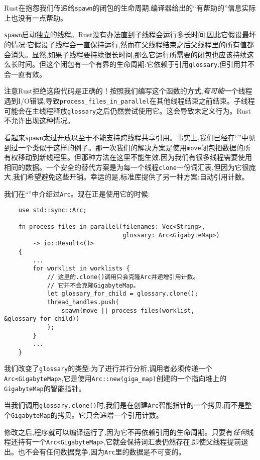 Rust在抱怨我们传递给\texttt{spawn}的闭包的生命周期,编译器给出的“有帮助的”信息实际上也没有一点帮助。

\texttt{spawn}启动独立的线程。Rust没有办法直到子线程会运行多长时间,因此它假设最坏的情况:它假设子线程会一直保持运行,然而在父线程结束之后父线程里的所有值都会消失。显然,如果子线程要持续很长时间,那么它运行所需要的闭包也应该持续这么长时间。但这个闭包有一个有界的生命周期:它依赖于引用\texttt{glossary},但引用并不会一直有效。

注意Rust拒绝这段代码是正确的！按照我们编写这个函数的方式,\emph{有可能}一个线程遇到I/O错误,导致\texttt{process\_files\_in\_parallel}在其他线程结束之前结束。子线程可能会在主线程释放\texttt{glossary}之后仍然尝试使用它。这会导致未定义行为。Rust不允许出现这种情况。

看起来\texttt{spawn}太过开放以至于不能支持跨线程共享引用。事实上,我们已经在“”中见到过一个类似于这样的例子。那一次我们的解决方案是使用\texttt{move}闭包把数据的所有权移动到新线程里。但那种方法在这里不能生效,因为我们有很多线程需要使用相同的数据。一个安全的替代方案是为每一个线程\texttt{clone}一份词汇表,但因为它很庞大,我们希望避免这些开销。幸运的是,标准库提供了另一种方案:自动引用计数。

我们在“”中介绍过\texttt{Arc}。现在正是使用它的时候:
\begin{verbatim}
    use std::sync::Arc;

    fn process_files_in_parallel(filenames: Vec<String>,
                                 glossary: Arc<GigabyteMap>)
        -> io::Result<()>
    {
        ...
        for worklist in worklists {
            // 这里的.clone()调用只会克隆Arc并递增引用计数。
            // 它并不会克隆GigabyteMap。
            let glossary_for_child = glossary.clone();
            thread_handles.push(
                spawn(move || process_files(worklist, &glossary_for_child))
            );
        }
        ...
    }
\end{verbatim}

我们改变了\texttt{glossary}的类型:为了进行并行分析,调用者必须传递一个\texttt{Arc<GigabyteMap>},它是使用\texttt{Arc::new(giga\_map)}创建的一个指向堆上的\texttt{GigabyteMap}的智能指针。

当我们调用\texttt{glossary.clone()}时,我们是在创建\texttt{Arc}智能指针的一个拷贝,而不是整个\texttt{GigabyteMap}的拷贝。它只会递增一个引用计数。

修改之后,程序就可以编译运行了,因为它不再依赖引用的生命周期。只要有\emph{任何}线程还持有一个\texttt{Arc<GigabyteMap>},它就会保持词汇表仍然存在,即使父线程提前退出。也不会有任何数据竞争,因为\texttt{Arc}里的数据是不可变的。

